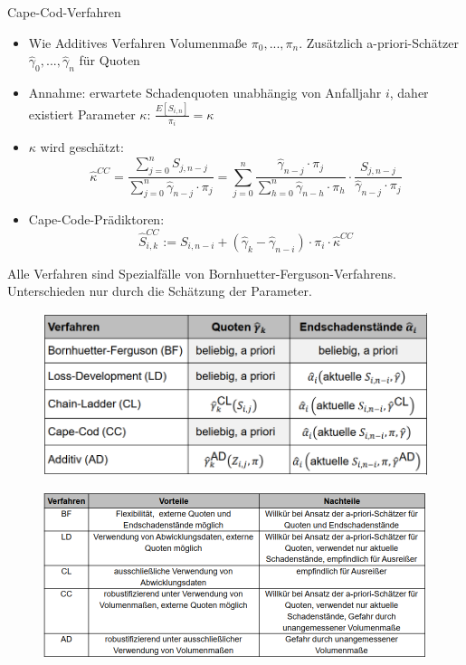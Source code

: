 \documentclass[12pt]{report}
\theoremstyle{dotless}
\theoremstyle{definition}
\begin{document}
Cape-Cod-Verfahren
\begin{itemize}
\item Wie Additives Verfahren Volumenmaße $\pi_0,...,\pi_n$. Zusätzlich a-priori-Schätzer $\hat{\gamma}_0,...,\hat{\gamma}_n$ für Quoten
\item Annahme: erwartete Schadenquoten unabhängig von Anfalljahr $i$, daher existiert Parameter $\kappa$: $\frac{E[S_{i,n}]}{\pi_i}=\kappa$
\item $\kappa$ wird geschätzt:
\begin{equation}
\hat{\kappa}^{CC} = \frac{\sum_{j=0}^n S_{j,n-j}}{\sum_{j=0}^n \hat{\gamma}_{n-j} \cdot \pi_j} = \sum_{j=0}^n \frac{\hat{\gamma}_{n-j} \cdot \pi_j}{\sum_{h=0}^n \hat{\gamma}_{n-h} \cdot \pi_h} \cdot \frac{S_{j,n-j}}{\hat{\gamma}_{n-j}\cdot \pi_j}
\end{equation}
\item Cape-Code-Prädiktoren: 
\begin{equation}
\hat{S}_{i,k}^{CC} := S_{i,n-i} + (\hat{\gamma}_k - \hat{\gamma}_{n-i}) \cdot \pi_i \cdot \hat{\kappa}^{CC}
\end{equation}
\end{itemize}
Alle Verfahren sind Spezialfälle von Bornhuetter-Ferguson-Verfahrens. Unterschieden nur durch die Schätzung der Parameter.
\begin{figure}[ht]
	\centering
	\includegraphics[width=.8\textwidth]{Bilder/Abwicklungsverfahren.png}
\end{figure}
\begin{figure}[ht]
	\centering
	\includegraphics[width=\textwidth]{Bilder/Abwicklungsverfahren_PundC.png}
\end{figure}
\end{document}

